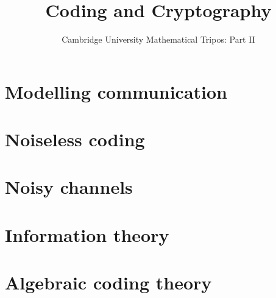 \documentclass{article}
\title{Coding and Cryptography}
\author{Cambridge University Mathematical Tripos: Part II}
\begin{document}
\maketitle

\tableofcontentsnewpage{}

\section{Modelling communication}

\section{Noiseless coding}

\section{Noisy channels}

\section{Information theory}

\section{Algebraic coding theory}

\end{document}
